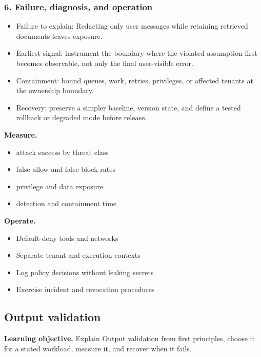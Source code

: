 \subsubsection*{6. Failure, diagnosis, and operation}
\begin{itemize}
\item Failure to explain: Redacting only user messages while retaining retrieved documents leaves exposure.
\item Earliest signal: instrument the boundary where the violated assumption first becomes observable, not only the final user-visible error.
\item Containment: bound queues, work, retries, privileges, or affected tenants at the ownership boundary.
\item Recovery: preserve a simpler baseline, version state, and define a tested rollback or degraded mode before release.
\end{itemize}
\textbf{Measure.}\begin{itemize}
\item attack success by threat class
\item false allow and false block rates
\item privilege and data exposure
\item detection and containment time
\end{itemize}
\textbf{Operate.}\begin{itemize}
\item Default-deny tools and networks
\item Separate tenant and execution contexts
\item Log policy decisions without leaking secrets
\item Exercise incident and revocation procedures
\end{itemize}
\subsection{Output validation}
\textbf{Learning objective.} Explain Output validation from first principles, choose it for a stated workload, measure it, and recover when it fails.
